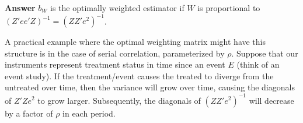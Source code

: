 \documentclass[11pt]{exam}
\begin{document}
\begin{questions}
\textbf{Answer} $b_W$ is the optimally weighted estimator if $W$ is proportional to $(Z'ee'Z)^{-1} = (ZZ'e^2)^{-1}$. 

A practical example where the optimal weighting matrix might have this structure is in the case of serial correlation, parameterized by $\rho$. Suppose that our instruments represent treatment status in time since an event $E$ (think of an event study). If the treatment/event causes the treated to diverge from the untreated over time, then the variance will grow over time, causing the diagonals of $Z'Ze^2$ to grow larger. Subsequently, the diagonals of $(ZZ'e^2)^{-1}$ will decrease by a factor of $\rho$ in each period. 


\end{questions}
    
    
    
\end{document}
